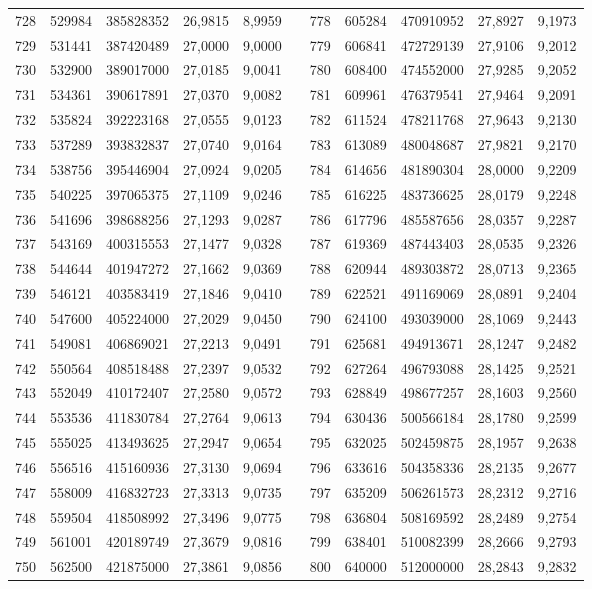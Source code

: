 \begin{longtable}{rrrrrrrrrrr}
728&529984&385828352&26,9815&8,9959&&778&605284&470910952&27,8927&9,1973\\
729&531441&387420489&27,0000&9,0000&&779&606841&472729139&27,9106&9,2012\\
730&532900&389017000&27,0185&9,0041&&780&608400&474552000&27,9285&9,2052\\
731&534361&390617891&27,0370&9,0082&&781&609961&476379541&27,9464&9,2091\\
732&535824&392223168&27,0555&9,0123&&782&611524&478211768&27,9643&9,2130\\
733&537289&393832837&27,0740&9,0164&&783&613089&480048687&27,9821&9,2170\\
734&538756&395446904&27,0924&9,0205&&784&614656&481890304&28,0000&9,2209\\
735&540225&397065375&27,1109&9,0246&&785&616225&483736625&28,0179&9,2248\\
736&541696&398688256&27,1293&9,0287&&786&617796&485587656&28,0357&9,2287\\
737&543169&400315553&27,1477&9,0328&&787&619369&487443403&28,0535&9,2326\\
738&544644&401947272&27,1662&9,0369&&788&620944&489303872&28,0713&9,2365\\
739&546121&403583419&27,1846&9,0410&&789&622521&491169069&28,0891&9,2404\\
740&547600&405224000&27,2029&9,0450&&790&624100&493039000&28,1069&9,2443\\
741&549081&406869021&27,2213&9,0491&&791&625681&494913671&28,1247&9,2482\\
742&550564&408518488&27,2397&9,0532&&792&627264&496793088&28,1425&9,2521\\
743&552049&410172407&27,2580&9,0572&&793&628849&498677257&28,1603&9,2560\\
744&553536&411830784&27,2764&9,0613&&794&630436&500566184&28,1780&9,2599\\
745&555025&413493625&27,2947&9,0654&&795&632025&502459875&28,1957&9,2638\\
746&556516&415160936&27,3130&9,0694&&796&633616&504358336&28,2135&9,2677\\
747&558009&416832723&27,3313&9,0735&&797&635209&506261573&28,2312&9,2716\\
748&559504&418508992&27,3496&9,0775&&798&636804&508169592&28,2489&9,2754\\
749&561001&420189749&27,3679&9,0816&&799&638401&510082399&28,2666&9,2793\\
750&562500&421875000&27,3861&9,0856&&800&640000&512000000&28,2843&9,2832\\

\end{longtable}
